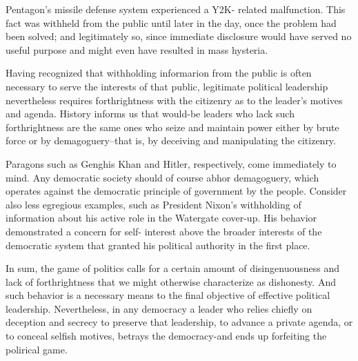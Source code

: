 Pentagon's missile defense system experienced a Y2K- related malfunction.
This fact was withheld from the public until later in the day, once the problem had been solved; and legitimately so, since immediate disclosure would have served no useful purpose and might even have resulted in mass hysteria.


Having recognized that withholding informarion from the public is often necessary to serve the interests of that public, legitimate political leadership nevertheless requires forthrightness with the citizenry as to the leader's motives and agenda.
History informs us that would-be leaders who lack such forthrightness are the same ones who seize and maintain power either by brute force or by demagoguery--that is, by deceiving and manipulating the citizenry.


Paragons such as Genghis Khan and Hitler, respectively, come immediately to mind.
Any democratic society should of course abhor demagoguery, which operates against the democratic principle of government by the people.
Consider also less egregious examples, such as President Nixon's withholding of information about his active role in the Watergate cover-up.
His behavior demonstrated a concern for self- interest above the broader interests of the democratic system that granted his political authority in the first place.


In sum, the game of politics calls for a certain amount of disingenuousness and lack of forthrightness that we might otherwise characterize as dishonesty.
And such behavior is a necessary means to the final objective of effective political leadership.
Nevertheless, in any democracy a leader who relies chiefly on deception and secrecy to preserve that leadership, to advance a private agenda, or to conceal selfish motives, betrays the democracy-and ends up forfeiting the polirical game.
